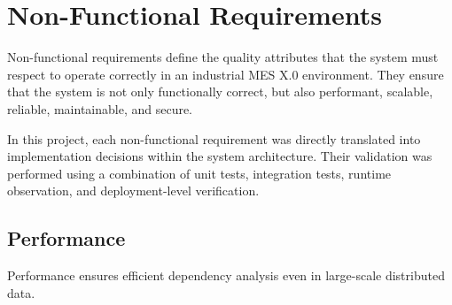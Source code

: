 \section{Non-Functional Requirements}
\label{sec:nonfunctional-requirements}

Non-functional requirements define the quality attributes that the system must respect to operate correctly in an industrial MES X.0 environment. They ensure that the system is not only functionally correct, but also performant, scalable, reliable, maintainable, and secure.

In this project, each non-functional requirement was directly translated into implementation decisions within the system architecture. Their validation was performed using a combination of unit tests, integration tests, runtime observation, and deployment-level verification.

% 
\subsection{Performance}

Performance ensures efficient dependency analysis even in large-scale distributed data.

